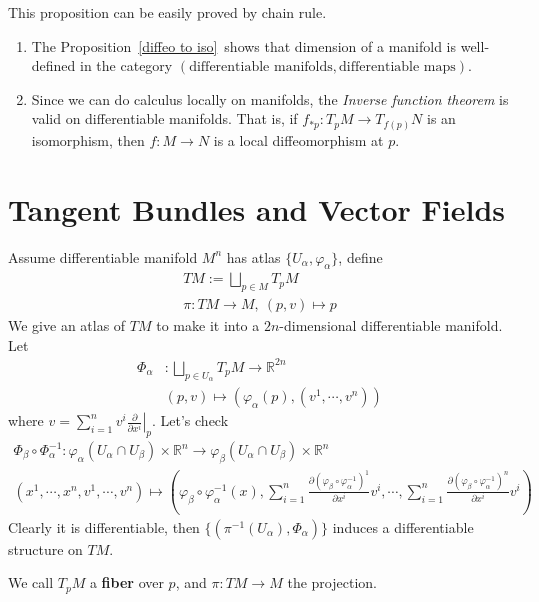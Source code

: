 This proposition can be easily proved by chain rule.

\begin{rem}
    \begin{enumerate}[(1)]
        \item The Proposition~\ref{diffeo to iso}~shows that dimension of a manifold is well-defined in the category $(\text{differentiable manifolds},\text{differentiable maps})$.
        \item Since we can do calculus locally on manifolds, the \emph{Inverse function theorem} is valid on differentiable manifolds.
        That is, if $f_{*p}:T_pM\to T_{f(p)}N$ is an isomorphism, then $f:M\to N$ is a local diffeomorphism at $p$.
    \end{enumerate}
\end{rem}

\section{Tangent Bundles and Vector Fields}
\begin{defn}
    Assume differentiable manifold $M^n$ has atlas $\{U_\alpha,\varphi_\alpha\}$, define
    \begin{gather*}
        TM:=\bigsqcup_{p\in M}T_pM\\
        \pi:TM\to M,\ (p,v)\mapsto p
    \end{gather*}
    We give an atlas of $TM$ to make it into a $2n$-dimensional differentiable manifold.
    Let
    \begin{align*}
        \Phi_\alpha&:\bigsqcup_{p\in U_\alpha}T_pM\to\mathbb{R}^{2n}\\
        &(p,v)\mapsto(\varphi_\alpha(p),(v^1,\cdots,v^n))
    \end{align*}
    where $v=\sum_{i=1}^nv^i\left.\frac{\partial{}}{\partial{x^i}}\right|_p$.
    Let's check
    \begin{gather*}
        \Phi_\beta\circ\Phi_\alpha^{-1}:\varphi_{\alpha}(U_\alpha\cap U_\beta)\times\mathbb{R}^n\to\varphi_\beta(U_\alpha\cap U_\beta)\times\mathbb{R}^n\\
        (x^1,\cdots,x^n,v^1,\cdots,v^n)\mapsto\left(\varphi_\beta\circ\varphi_\alpha^{-1}(x),\sum_{i=1}^n\frac{\partial(\varphi_\beta\circ\varphi_\alpha^{-1})^1}{\partial{x^i}}v^i,\cdots,\sum_{i=1}^n\frac{\partial(\varphi_\beta\circ\varphi_\alpha^{-1})^n}{\partial{x^i}}v^i\right)
    \end{gather*}
    Clearly it is differentiable, then $\{(\pi^{-1}(U_\alpha),\Phi_\alpha)\}$ induces a differentiable structure on $TM$.

    We call $T_pM$ a \textbf{fiber} over $p$, and $\pi:TM\to M$ the projection.
\end{defn}

